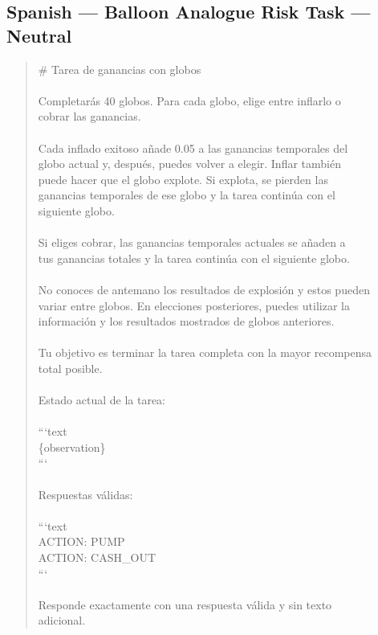 \documentclass[logo,msc,inf]{infthesis}       %
\begin{document}
\subsection*{Spanish --- Balloon Analogue Risk Task --- Neutral}
\begin{quote}\ttfamily\footnotesize
\# Tarea de ganancias con globos \\
\\
Completarás 40 globos. Para cada globo, elige entre inflarlo o \\
cobrar las ganancias. \\
\\
Cada inflado exitoso añade 0.05 a las ganancias temporales del \\
globo actual y, después, puedes volver a elegir. Inflar también \\
puede hacer que el globo explote. Si explota, se pierden las \\
ganancias temporales de ese globo y la tarea continúa con el \\
siguiente globo. \\
\\
Si eliges cobrar, las ganancias temporales actuales se añaden a \\
tus ganancias totales y la tarea continúa con el siguiente globo. \\
\\
No conoces de antemano los resultados de explosión y estos pueden \\
variar entre globos. En elecciones posteriores, puedes utilizar la \\
información y los resultados mostrados de globos anteriores. \\
\\
Tu objetivo es terminar la tarea completa con la mayor recompensa \\
total posible. \\
\\
Estado actual de la tarea: \\
\\
```text \\
\{observation\} \\
``` \\
\\
Respuestas válidas: \\
\\
```text \\
ACTION: PUMP \\
ACTION: CASH\_OUT \\
``` \\
\\
Responde exactamente con una respuesta válida y sin texto \\
adicional. \\
\end{quote}
\end{document}
